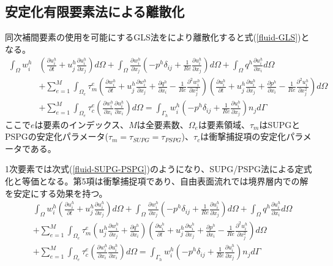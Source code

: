 \subsection{安定化有限要素法による離散化}
同次補間要素の使用を可能にするGLS法をにより離散化すると式(\ref{fluid-GLS})となる。
\begin{equation}
\label{fluid-GLS}
	\begin{aligned} 
		\int_{\Omega} w_i^h & \left(\frac{\partial u_i^h}{\partial t}+u_j^h \frac{\partial u_i^h}{\partial x_j}\right) d \Omega
		+ \int_{\Omega} \frac{\partial w_i^h}{\partial x_j}\left(-p^h \delta_{i j}+\frac{1}{R e} \frac{\partial u_i^h}{\partial x_j}\right) d \Omega
		+ \int_{\Omega} q^h \frac{\partial u_i^h}{\partial x_i} d \Omega \\ & 
		+ \sum_{e=1}^M \int_{\Omega_e} \tau_m^e\left(\frac{\partial w_i^h}{\partial t}+u_j^h \frac{\partial w_i^h}{\partial x_j}+\frac{\partial q^h}{\partial x_i}-\frac{1}{R e} \frac{\partial^2 w_i^h}{\partial x_j^2}\right)\left(\frac{\partial u_i^h}{\partial t}+u_j^h \frac{\partial u_i^h}{\partial x_j}+\frac{\partial p^h}{\partial x_i}-\frac{1}{R e} \frac{\partial^2 u_i^h}{\partial x_j^2}\right) d \Omega \\ & 
		+ \sum_{e=1}^M \int_{\Omega_e} \tau_c^e\left(\frac{\partial w_i^h}{\partial x_i} \frac{\partial u_i^h}{\partial x_i}\right) d \Omega
		= \int_{\Gamma_h} w_i^h\left(-p^h \delta_{i j}+\frac{1}{R e} \frac{\partial u_i^h}{\partial x_j}\right) n_j d \Gamma
	\end{aligned}
\end{equation}
ここで$e$は要素のインデックス、$M$は全要素数、$\Omega_{e}$は要素領域、$\tau_{m}$はSUPGとPSPGの安定化パラメータ($\tau_{m}=\tau_{SUPG}=\tau_{PSPG}$)、$\tau_{c}$は衝撃捕捉項の安定化パラメータである。

1次要素では次式(\ref{fluid-SUPG-PSPG})のようになり、SUPG/PSPG法による定式化と等価となる。第5項は衝撃捕捉項であり、自由表面流れでは境界層内での解を安定にする効果を持つ。
\begin{equation}
\label{fluid-SUPG-PSPG}
	\begin{aligned}
		& \int_{\Omega} w_i^h\left(\frac{\partial u_i^h}{\partial t}+u_j^h \frac{\partial u_i^h}{\partial x_j}\right) d \Omega+\int_{\Omega} \frac{\partial w_i^h}{\partial x_j}\left(-p^h \delta_{i j}+\frac{1}{R e} \frac{\partial u_i^h}{\partial x_j}\right) d \Omega+\int_{\Omega} q^h \frac{\partial u_i^h}{\partial x_i} d \Omega \\
		& +\sum_{e=1}^M \int_{\Omega_e} \tau_m^e\left(u_j^h \frac{\partial w_i^h}{\partial x_j}+\frac{\partial q^h}{\partial x_i}\right)\left(\frac{\partial u_i^h}{\partial t}+u_j^h \frac{\partial u_i^h}{\partial x_j}+\frac{\partial p^h}{\partial x_i}-\frac{1}{R e} \frac{\partial^2 u_i^h}{\partial x_j^2}\right) d \Omega \\
		& + \sum_{e=1}^M \int_{\Omega_e} \tau_c^e\left(\frac{\partial w_i^h}{\partial x_i} \frac{\partial u_i^h}{\partial x_i}\right) d \Omega 
		= \int_{\Gamma_h} w_i^h\left(-p^h \delta_{i j}+\frac{1}{R e} \frac{\partial u_i^h}{\partial x_j}\right) n_j d \Gamma
	\end{aligned}
\end{equation}


